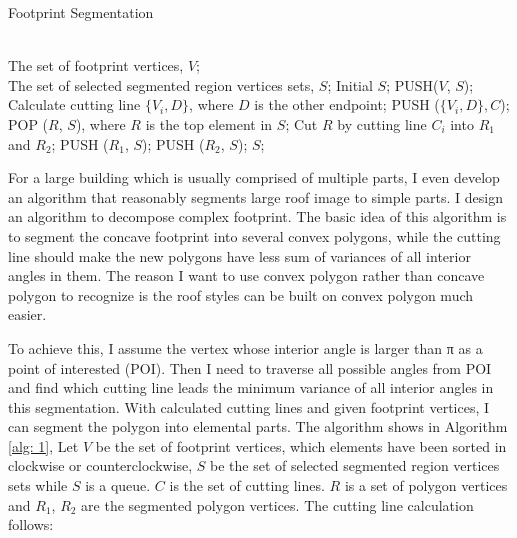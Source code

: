 \documentclass{iitthesis}
\begin{document}
{\linespread{1.5}
\begin{algorithm}[ht]   
    \caption{ Footprint Segmentation}   
    \label{alg: 1}   
    \begin{algorithmic}[1] 
        \REQUIRE ~~\\
        The set of footprint vertices, $V$; 
        \ENSURE ~~\\  
        The set of selected segmented region vertices sets, $S$; 
        \STATE Initial $S$;  
        \STATE PUSH($V$, $S$); 
                    \STATE Calculate cutting line $\{V_i, D\}$, where $D$ is the other endpoint;
                    \STATE PUSH ($\{V_i, D\}, C$);
                \ENDIF
            \ENDFOR
                    \STATE POP ($R$, $S$), where $R$ is the top element in $S$;
                    \STATE Cut $R$ by cutting line $C_i$ into $R_1$ and $R_2$;
                    \STATE PUSH ($R_1$, $S$);
                    \STATE PUSH ($R_2$, $S$);
                \ENDFOR
            \ENDFOR
        \ENDIF   
        \RETURN $S$; 
    \end{algorithmic}  
\end{algorithm}  
}

For a large building which is usually comprised of multiple parts, I even develop an algorithm that reasonably segments large roof image to simple parts. I design an algorithm to decompose complex footprint. The basic idea of this algorithm is to segment the concave footprint into several convex polygons, while the cutting line should make the new polygons have less sum of variances of all interior angles in them. The reason I want to use convex polygon rather than concave polygon to recognize is the roof styles can be built on convex polygon much easier. 

To achieve this, I assume the vertex whose interior angle is larger than π as a point of interested (POI). Then I need to traverse all possible angles from POI and find which cutting line leads the minimum variance of all interior angles in this segmentation. With calculated cutting lines and given footprint vertices, I can segment the polygon into elemental parts. The algorithm shows in Algorithm \ref{alg: 1}, Let $V$ be the set of footprint vertices, which elements have been sorted in clockwise or counterclockwise, $S$ be the set of selected segmented region vertices sets while $S$ is a queue. $C$ is the set of cutting lines. $R$ is a set of polygon vertices and $R_1$, $R_2$ are the segmented polygon vertices. The cutting line calculation follows:
\end{document}

